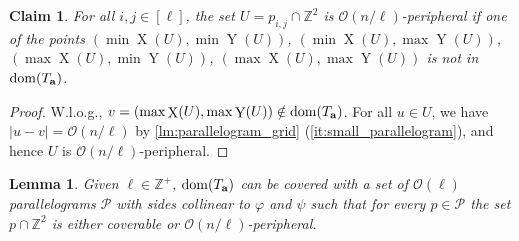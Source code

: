 \documentclass[a4paper,11pt]{article}
\newtheorem{lemma}{Lemma}[section]
\newtheorem{claim}{Claim}[section]
\newcommand{\Z}{\mathbb{Z}}
\renewcommand{\O}{\mathcal{O}}
\newcommand{\Ta}{T_\mathbf{a}}
\renewcommand{\phi}{\varphi}
\DeclareMathOperator*{\X}{X}
\DeclareMathOperator*{\Y}{Y}
\newcommand{\absolute}[1]{\left\lvert#1\right\rvert}
\begin{document}
\begin{claim}\label{peripheral}
For all $i,j \in [\ell]$, the set $U = p_{i,j} \cap \Z^2$ is $\O(n / \ell)$-peripheral if one of the points $(\min \X(U), \min \Y(U))$, $(\min \X(U), \max \Y(U))$, $(\max \X(U), \min \Y(U))$, $(\max \X(U), \max \Y(U))$ is not in $\d{\Ta}$.
\end{claim}
\begin{proof}
W.l.o.g., $v = (\max \X(U), \max \Y(U)) \notin \d{\Ta}$. For all $u \in U$, we have $\absolute{u-v} = \O(n / \ell)$ by \cref{lm:parallelogram_grid} (\ref{it:small_parallelogram}), and hence $U$ is $\O(n / \ell)$-peripheral.
\end{proof}

\begin{lemma}\label{lm:parallelogram_merge}
Given $\ell \in \Z^+$, $\d{\Ta}$ can be covered with a set of $\O(\ell)$ parallelograms $\mathcal{P}$ with sides collinear to $\phi$ and $\psi$ such that for every $p \in \mathcal{P}$ the set $p \cap \Z^2$ is either coverable or $\O(n / \ell)$-peripheral. 
\end{lemma}
\end{document}
